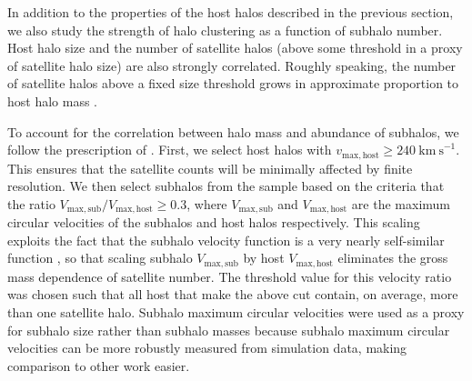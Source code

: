 \documentclass[usenatbib]{mnras}
\begin{document}


In addition to the properties of the host halos described in the previous section, 
we also study the strength of halo clustering as a function of subhalo number. 
Host halo size and the number of satellite halos (above some threshold in a proxy of satellite halo size) 
are also strongly correlated. Roughly speaking, the number of satellite halos above a fixed 
size threshold grows in approximate proportion to host halo mass \cite[e.g.,][]{zentner_etal05}. 


To account for the correlation between halo mass and abundance of subhalos, 
we follow the prescription of \citet{wechsler_etal06}. First, we select host halos 
with $v_{\mathrm{max,host}} \ge 240 \ \mathrm{km \ s}^{-1}$. This ensures that the satellite counts 
will be minimally affected by finite resolution. We then select subhalos
from the sample based on the criteria that the ratio $V_{\mathrm{max,sub}}/V_{\mathrm{max,host}} \ge 0.3$, 
where $V_{\mathrm{max,sub}}$ and $V_{\mathrm{max,host}}$ are the maximum circular velocities 
of the subhalos and host halos respectively. This scaling exploits the fact that the subhalo velocity 
function is a very nearly self-similar function \citep[][, and references therein]{zentner_etal05}, 
so that scaling subhalo $V_{\mathrm{max,sub}}$ by host $V_{\mathrm{max,host}}$ 
eliminates the gross mass dependence of satellite number. The threshold value for this velocity ratio was chosen 
such that all host that make the above cut contain, on average, more than one satellite halo. 
Subhalo maximum circular velocities were used as a proxy for subhalo size rather than subhalo masses because 
subhalo maximum circular velocities can be more robustly measured from simulation data, making 
comparison to other work easier.
\end{document}
